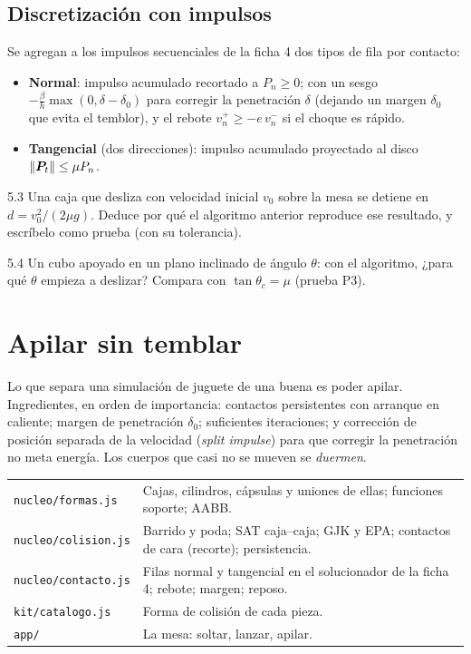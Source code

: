\documentclass[11pt,a4paper]{article}
\begin{document}
\subsection{Discretización con impulsos}
Se agregan a los impulsos secuenciales de la ficha 4 dos tipos de fila por contacto:
\begin{itemize}[leftmargin=*]
  \item \textbf{Normal}: impulso acumulado recortado a $P_n\ge0$; con un sesgo $-\tfrac{\beta}{h}\max(0, \delta - \delta_0)$
        para corregir la penetración $\delta$ (dejando un margen $\delta_0$ que evita el temblor), y el rebote
        $v_n^+\ge -e\,v_n^-$ si el choque es rápido.
  \item \textbf{Tangencial} (dos direcciones): impulso acumulado proyectado al disco $\lVert\bm{P}_t\rVert\le\mu P_n$.
\end{itemize}

\begin{ejercicio}{5.3}
Una caja que desliza con velocidad inicial $v_0$ sobre la mesa se detiene en $d = v_0^2/(2\mu g)$. Deduce por qué el
algoritmo anterior reproduce ese resultado, y escríbelo como prueba (con su tolerancia).
\end{ejercicio}

\begin{ejercicio}{5.4}
Un cubo apoyado en un plano inclinado de ángulo $\theta$: con el algoritmo, ¿para qué $\theta$ empieza a deslizar?
Compara con $\tan\theta_c = \mu$ (prueba P3).
\end{ejercicio}

\section{Apilar sin temblar}

Lo que separa una simulación de juguete de una buena es poder apilar. Ingredientes, en orden de importancia:
contactos persistentes con arranque en caliente; margen de penetración $\delta_0$; suficientes iteraciones; y
corrección de posición separada de la velocidad (\emph{split impulse}) para que corregir la penetración no meta
energía. Los cuerpos que casi no se mueven se \emph{duermen}.

\begin{codigo}
\begin{tabularx}{\linewidth}{@{}l Y@{}}
\texttt{nucleo/formas.js} & Cajas, cilindros, cápsulas y uniones de ellas; funciones soporte; AABB.\\
\texttt{nucleo/colision.js} & Barrido y poda; SAT caja–caja; GJK y EPA; contactos de cara (recorte); persistencia.\\
\texttt{nucleo/contacto.js} & Filas normal y tangencial en el solucionador de la ficha 4; rebote; margen; reposo.\\
\texttt{kit/catalogo.js} & Forma de colisión de cada pieza.\\
\texttt{app/} & La mesa: soltar, lanzar, apilar.\\
\end{tabularx}
\end{codigo}
\end{document}
